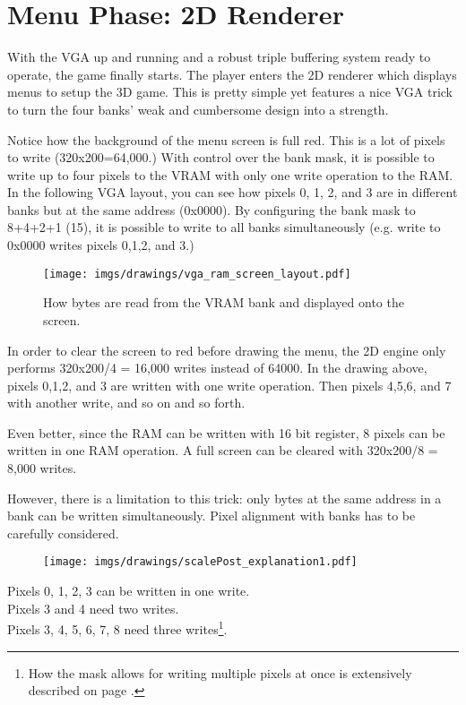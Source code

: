 \section{Menu Phase: 2D Renderer}
With the VGA up and running and a robust triple buffering system ready to operate, the game finally starts. The player enters the 2D renderer which displays menus to setup the 3D game. This is pretty simple yet features a nice VGA trick to turn the four banks' weak and cumbersome design into a strength.
\par
\begin{figure}[H]
\centering
{}
\end{figure}
\par

Notice how the background of the menu screen is full red. This is a lot of pixels to write (320x200=64,000.) With control over the bank mask, it is possible to write up to four pixels to the VRAM with only one write operation to the RAM. In the following VGA layout, you can see how pixels 0, 1, 2, and 3 are in different banks but at the same address (0x0000). By configuring the bank mask to 8+4+2+1 (15), it is possible to write to all banks simultaneously (e.g. write to 0x0000 writes pixels 0,1,2, and 3.)\\
\par
\begin{figure}[H]
\centering
\texttt{[image: imgs/drawings/vga\_ram\_screen\_layout.pdf]}
\caption{How bytes are read from the VRAM bank and displayed onto the screen.}
\end{figure}

\par
In order to clear the screen to red before drawing the menu, the 2D engine only performs 320x200/4 = 16,000 writes instead of 64000. In the drawing above, pixels 0,1,2, and 3 are written with one write operation. Then pixels 4,5,6, and 7 with another write, and so on and so forth.\\
\par
Even better, since the RAM can be written with 16 bit register, 8 pixels can be written in one RAM operation. A full screen can be cleared with 320x200/8 = 8,000 writes.
\par
\begin{minipage}{\textwidth}

\end{minipage}
However, there is a limitation to this trick: only bytes at the same address in a bank can be written simultaneously. Pixel alignment with banks has to be carefully considered.\
\par
\begin{figure}[H]
\centering
 \texttt{[image: imgs/drawings/scalePost\_explanation1.pdf]}
 
 \end{figure}
Pixels 0, 1, 2, 3 can be written in one write.\\
Pixels 3 and 4 need two writes.\\
Pixels 3, 4, 5, 6, 7, 8 need three writes\footnote{How the mask allows for writing multiple pixels at once is extensively described on page \pageref{simd_vga}.}.\\


